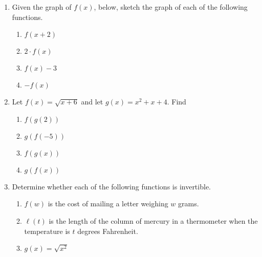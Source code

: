 \documentclass[11pt]{article}
\begin{document}
\drawtitle

\begin{enumerate}
\item Given the graph of $f(x)$, below, sketch the graph of each of the
  following functions.
  \begin{center}
  \end{center}
  \begin{multicols*}{2} %
    \begin{enumerate}
    \item $f(x+2)$
      \vfill
    \item $2\cdot f(x)$
      \vfill
      \columnbreak
    \item $f(x)-3$
      \vfill
    \item $-f(x)$
    \end{enumerate}
  \end{multicols*}

  \newpage

\item Let $f(x) = \sqrt{x + 6}$ and let $g(x) = x^2 + x + 4$.  Find
  \begin{enumerate}
  \item $f(g(2))$
    \vfill
  \item $g(f(-5))$
    \vfill
  \item $f(g(x))$
    \vfill
  \item $g(f(x))$
    \vfill
  \end{enumerate}

\item Determine whether each of the following functions is invertible.
  \begin{enumerate}
  \item $f(w)$ is the cost of mailing a letter weighing $w$ grams.
    \vfill
  \item $\ell(t)$ is the length of the column of mercury in a
    thermometer when the temperature is $t$ degrees Fahrenheit.
    \vfill
  \item $g(x) = \sqrt{x^2}$
    \vfill
  \end{enumerate}


\end{enumerate}
\end{document}
